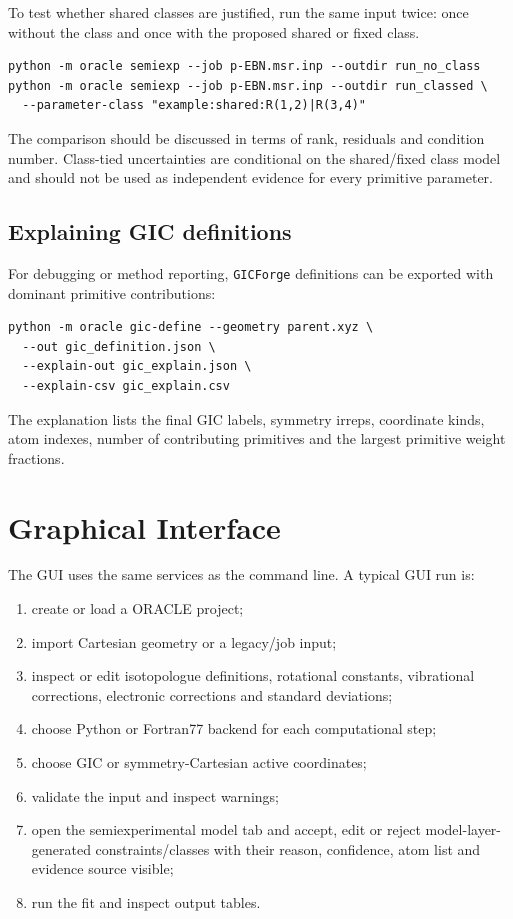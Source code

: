 \documentclass[11pt]{article}
\newcommand{\gicforge}{\texttt{GICForge}}
\begin{document}
To test whether shared classes are justified, run the same input twice: once
without the class and once with the proposed shared or fixed class.

\begin{lstlisting}[style=oracle]
python -m oracle semiexp --job p-EBN.msr.inp --outdir run_no_class
python -m oracle semiexp --job p-EBN.msr.inp --outdir run_classed \
  --parameter-class "example:shared:R(1,2)|R(3,4)"
\end{lstlisting}

\noindent
The comparison should be discussed in terms of rank, residuals and condition
number.  Class-tied uncertainties are conditional on the shared/fixed class
model and should not be used as independent evidence for every primitive
parameter.

\subsection{Explaining GIC definitions}

For debugging or method reporting, \gicforge{} definitions can be exported with
dominant primitive contributions:

\begin{lstlisting}[style=oracle]
python -m oracle gic-define --geometry parent.xyz \
  --out gic_definition.json \
  --explain-out gic_explain.json \
  --explain-csv gic_explain.csv
\end{lstlisting}

\noindent
The explanation lists the final GIC labels, symmetry irreps, coordinate kinds,
atom indexes, number of contributing primitives and the largest primitive
weight fractions.

\section{Graphical Interface}

The GUI uses the same services as the command line.  A typical GUI run is:

\begin{enumerate}
  \item create or load a ORACLE project;
  \item import Cartesian geometry or a legacy/job input;
  \item inspect or edit isotopologue definitions, rotational constants,
        vibrational corrections, electronic corrections and standard
        deviations;
  \item choose Python or Fortran77 backend for each computational step;
  \item choose GIC or symmetry-Cartesian active coordinates;
  \item validate the input and inspect warnings;
  \item open the semiexperimental model tab and accept, edit or reject model-layer-generated
        constraints/classes with their reason, confidence, atom list and
        evidence source visible;
  \item run the fit and inspect output tables.
\end{enumerate}
\end{document}
